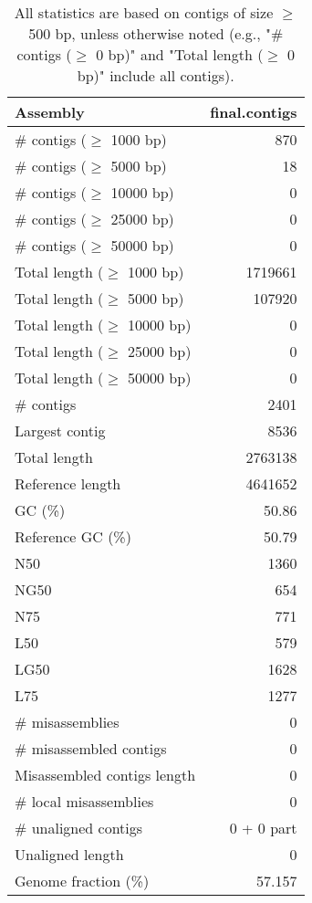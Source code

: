 \documentclass[12pt,a4paper]{article}
\begin{document}
\begin{table}[ht]
\begin{center}
\caption{All statistics are based on contigs of size $\geq$ 500 bp, unless otherwise noted (e.g., "\# contigs ($\geq$ 0 bp)" and "Total length ($\geq$ 0 bp)" include all contigs).}
\begin{tabular}{|l*{1}{|r}|}
\hline
Assembly & final.contigs \\ \hline
\# contigs ($\geq$ 1000 bp) & 870 \\ \hline
\# contigs ($\geq$ 5000 bp) & 18 \\ \hline
\# contigs ($\geq$ 10000 bp) & 0 \\ \hline
\# contigs ($\geq$ 25000 bp) & 0 \\ \hline
\# contigs ($\geq$ 50000 bp) & 0 \\ \hline
Total length ($\geq$ 1000 bp) & 1719661 \\ \hline
Total length ($\geq$ 5000 bp) & 107920 \\ \hline
Total length ($\geq$ 10000 bp) & 0 \\ \hline
Total length ($\geq$ 25000 bp) & 0 \\ \hline
Total length ($\geq$ 50000 bp) & 0 \\ \hline
\# contigs & 2401 \\ \hline
Largest contig & 8536 \\ \hline
Total length & 2763138 \\ \hline
Reference length & 4641652 \\ \hline
GC (\%) & 50.86 \\ \hline
Reference GC (\%) & 50.79 \\ \hline
N50 & 1360 \\ \hline
NG50 & 654 \\ \hline
N75 & 771 \\ \hline
L50 & 579 \\ \hline
LG50 & 1628 \\ \hline
L75 & 1277 \\ \hline
\# misassemblies & 0 \\ \hline
\# misassembled contigs & 0 \\ \hline
Misassembled contigs length & 0 \\ \hline
\# local misassemblies & 0 \\ \hline
\# unaligned contigs & 0 + 0 part \\ \hline
Unaligned length & 0 \\ \hline
Genome fraction (\%) & 57.157 \\ \hline

\end{tabular}
\end{center}
\end{table}
\end{document}
